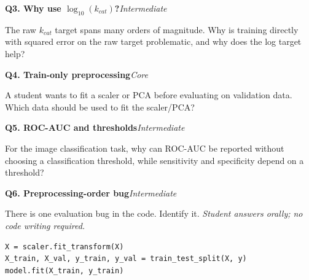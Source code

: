 \documentclass[11pt]{article}
\newif\ifshowanswers
\newenvironment{question}[3]{%
  \par\medskip
  \noindent\textbf{Q#1. #2}\hfill\textit{#3}\par\smallskip
}{\par\medskip}
\newcommand{\answer}[1]{%
  \ifshowanswers
    \begin{quote}\small\textbf{Expected answer:} #1\end{quote}
  \fi
}
\newcommand{\marking}[1]{%
  \ifshowanswers
    \begin{quote}\small\textbf{1 mark:} #1\end{quote}
  \fi
}
\newcommand{\oralnote}{\textit{Student answers orally; no code writing required.}}
\begin{document}
\begin{question}{3}{Why use $\log_{10}(k_{cat})$?}{Intermediate}
The raw $k_{cat}$ target spans many orders of magnitude. Why is training directly with squared error on the raw target problematic, and why does the log target help?

\answer{Very large raw values dominate squared error. Taking $\log_{10}$ compresses the range so extreme values do not dominate the loss to the same extent.}
\marking{Student connects orders-of-magnitude variation to domination of raw squared error and explains the role of the log transform.}
\end{question}

\begin{question}{4}{Train-only preprocessing}{Core}
A student wants to fit a scaler or PCA before evaluating on validation data. Which data should be used to fit the scaler/PCA?

\answer{Training data only; the fitted transform is then applied unchanged to validation and test data.}
\marking{Student says training split only.}
\end{question}

\begin{question}{5}{ROC-AUC and thresholds}{Intermediate}
For the image classification task, why can ROC-AUC be reported without choosing a classification threshold, while sensitivity and specificity depend on a threshold?

\answer{ROC-AUC evaluates the ranking of scores across thresholds. Sensitivity and specificity are computed after converting scores to class decisions at a chosen threshold.}
\marking{Student distinguishes threshold-independent ranking evaluation from threshold-dependent class decisions.}
\end{question}

\begin{question}{6}{Preprocessing-order bug}{Intermediate}
There is one evaluation bug in the code. Identify it. \oralnote

\begin{lstlisting}
X = scaler.fit_transform(X)
X_train, X_val, y_train, y_val = train_test_split(X, y)
model.fit(X_train, y_train)
\end{lstlisting}

\answer{The scaler is fitted before the train/validation split, so validation information leaks into preprocessing. Split first, fit the scaler on $X_{train}$ only, then transform validation data using that fitted scaler.}
\marking{Student identifies train--validation leakage caused by fitting preprocessing before the split.}
\end{question}
\end{document}
